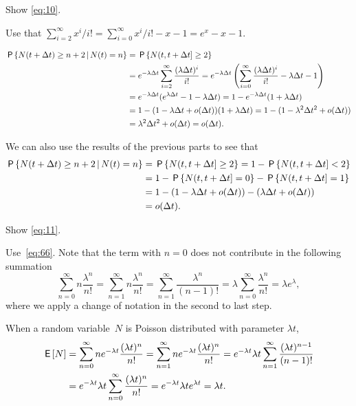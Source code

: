 \begin{exercise} \label{ex:p-35}
 Show \cref{eq:10}.
\begin{hint}
 Use that $\sum_{i=2}^\infty x^i/i! = \sum_{i=0}^\infty x^i/i! - x -1 = e^x -x - 1$.
\end{hint}
\begin{solution}
 \begin{align*}
 \,\mathsf{P}\left\{N(t+\Delta t) \geq n+2 \,\middle|\, N(t) = n\right\}
&= \,\mathsf{P}\left\{N(t, t+\Delta t] \geq 2\right\} \\
&= e^{-\lambda \Delta t} \sum_{i=2}^\infty \frac{(\lambda \Delta t)^i}{i!}
= e^{-\lambda \Delta t} \left(\sum_{i=0}^\infty \frac{(\lambda \Delta t)^i}{i!} - \lambda \Delta t - 1\right)\\
&= e^{-\lambda \Delta t}(e^{\lambda \Delta t} - 1 - \lambda \Delta t)
= 1 - e^{-\lambda \Delta t}(1 + \lambda \Delta t) \\
&= 1 - (1-\lambda \Delta t + o(\Delta t))(1+\lambda \Delta t)
= 1 - (1-\lambda^2 \Delta t^2 + o(\Delta t)) \\
&= \lambda^2 \Delta t^2 + o(\Delta t) = o(\Delta t).
 \end{align*}

We can also use the results of the previous parts to see that
\begin{align*}
 \,\mathsf{P}\left\{N(t+\Delta t) \geq n+2 \,\middle|\, N(t) = n\right\}
&= \,\mathsf{P}\left\{N(t, t+\Delta t] \geq 2\right\} = 1- \,\mathsf{P}\left\{N(t, t+\Delta t]<2\right\} \\
&= 1 - \,\mathsf{P}\left\{N(t, t+\Delta t]= 0\right\} - \,\mathsf{P}\left\{N(t, t+\Delta t]=1\right\} \\
&= 1 - (1-\lambda \Delta t + o(\Delta t) ) - (\lambda \Delta t + o(\Delta t)) \\
&= o(\Delta t).
\end{align*}
\end{solution}
\end{exercise}


\begin{exercise} \label{ex:2}
 Show \cref{eq:11}.
\begin{hint}
Use~\cref{eq:66}. Note that the term with $n=0$ does not contribute in the following summation
\begin{equation*}
\sum_{n=0}^\infty n \frac{\lambda^n}{n!} = \sum_{n=1}^\infty n \frac{\lambda^n}{n!} = \sum_{n=1}^\infty \frac{\lambda^n}{(n-1)!} = \lambda \sum_{n=0}^\infty \frac{\lambda^n}{n!} = \lambda e^{\lambda},
\end{equation*}
where we apply a change of notation in the second to last step.
\end{hint}
\begin{solution}
 When a random variable~$N$ is Poisson distributed with parameter
 $\lambda t$,
 \begin{align*}
 \,\mathsf{E}\left[N\right]
&= \sum_{n=0}^\infty n e^{-\lambda t}\frac{(\lambda t)^n}{n!}
= \sum_{n=1}^\infty n e^{-\lambda t}\frac{(\lambda t)^n}{n!}
= e^{-\lambda t} \lambda t \sum_{n=1}^\infty \frac{(\lambda t)^{n-1}}{(n-1)!} \\
&= e^{-\lambda t} \lambda t \sum_{n=0}^\infty \frac{(\lambda t)^{n}}{n!}
= e^{-\lambda t} \lambda t e^{\lambda t}
= \lambda t.
 \end{align*}
\end{solution}
\end{exercise}

